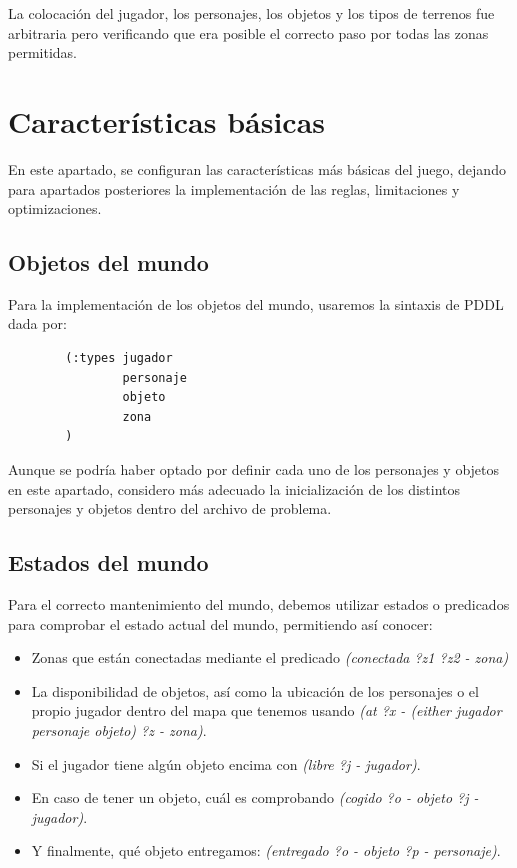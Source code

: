 \documentclass[a4paper, 11pt]{article}
\begin{document}
	La colocación del jugador, los personajes, los objetos y los tipos de terrenos fue arbitraria pero
	verificando que era posible el correcto paso por todas las zonas permitidas.

\section{Características básicas}
	En este apartado, se configuran las características más básicas del juego, dejando para apartados
	posteriores la implementación de las reglas, limitaciones y optimizaciones.
	
	\subsection{Objetos del mundo}
		Para la implementación de los objetos del mundo, usaremos la sintaxis de PDDL dada por:
		\begin{verbatim}
		(:types jugador
		        personaje
		        objeto
		        zona
		)
		\end{verbatim}
		
		Aunque se podría haber optado por definir cada uno de los personajes y objetos en este
		apartado, considero más adecuado la inicialización de los distintos personajes y objetos
		dentro del archivo de problema.
	
	\subsection{Estados del mundo}
		Para el correcto mantenimiento del mundo, debemos utilizar estados o predicados para comprobar
		el estado actual del mundo, permitiendo así conocer:
		\begin{itemize}
			\item Zonas que están conectadas mediante el predicado \textit{(conectada ?z1 ?z2 - zona)}
			\item La disponibilidad de objetos, así como la ubicación de los personajes o el propio
			jugador dentro del mapa que tenemos usando \textit{(at ?x - (either jugador personaje objeto)
			?z - zona)}.
			\item Si el jugador tiene algún objeto encima con \textit{(libre ?j - jugador)}.
			\item En caso de tener un objeto, cuál es comprobando \textit{(cogido ?o - objeto ?j -
			jugador)}.
			\item Y finalmente, qué objeto entregamos: \textit{(entregado ?o - objeto ?p - personaje)}.
		\end{itemize}
\end{document}

